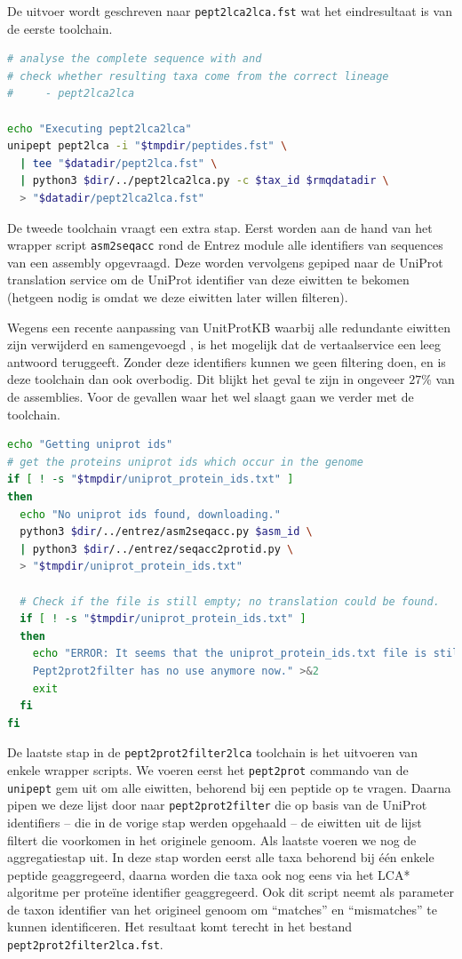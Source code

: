 De uitvoer wordt geschreven naar \texttt{pept2lca2lca.fst} wat het eindresultaat
is van de eerste toolchain.

\begin{lstlisting}[language=Bash,firstnumber=46]
# analyse the complete sequence with and
# check whether resulting taxa come from the correct lineage
#     - pept2lca2lca

echo "Executing pept2lca2lca"
unipept pept2lca -i "$tmpdir/peptides.fst" \
  | tee "$datadir/pept2lca.fst" \
  | python3 $dir/../pept2lca2lca.py -c $tax_id $rmqdatadir \
  > "$datadir/pept2lca2lca.fst"
\end{lstlisting}

De tweede toolchain vraagt een extra stap. Eerst worden aan de hand van het
wrapper script \texttt{asm2seqacc} rond de Entrez module alle identifiers van
sequences van een assembly opgevraagd. Deze worden vervolgens gepiped naar de
UniProt translation service om de UniProt identifier van deze eiwitten te
bekomen (hetgeen nodig is omdat we deze eiwitten later willen filteren).

Wegens een recente aanpassing van UnitProtKB waarbij alle redundante eiwitten
zijn verwijderd en samengevoegd \cite{Uniprotredun:online}, is het mogelijk
dat de vertaalservice een leeg antwoord teruggeeft. Zonder deze identifiers
kunnen we geen filtering doen, en is deze toolchain dan ook overbodig. Dit
blijkt het geval te zijn in ongeveer $27$\% van de assemblies. Voor de gevallen
waar het wel slaagt gaan we verder met de toolchain.

\begin{lstlisting}[language=Bash,firstnumber=55]
echo "Getting uniprot ids"
# get the proteins uniprot ids which occur in the genome
if [ ! -s "$tmpdir/uniprot_protein_ids.txt" ]
then
  echo "No uniprot ids found, downloading."
  python3 $dir/../entrez/asm2seqacc.py $asm_id \
  | python3 $dir/../entrez/seqacc2protid.py \
  > "$tmpdir/uniprot_protein_ids.txt"

  # Check if the file is still empty; no translation could be found.
  if [ ! -s "$tmpdir/uniprot_protein_ids.txt" ]
  then
    echo "ERROR: It seems that the uniprot_protein_ids.txt file is still empty. 
    Pept2prot2filter has no use anymore now." >&2
    exit
  fi
fi
\end{lstlisting}

De laatste stap in de \texttt{pept2prot2filter2lca} toolchain is het uitvoeren
van enkele wrapper scripts. We voeren eerst het \texttt{pept2prot} commando van
de \texttt{unipept} gem uit om alle eiwitten, behorend bij een peptide op te
vragen. Daarna pipen we deze lijst door naar \texttt{pept2prot2filter} die op
basis van de UniProt identifiers -- die in de vorige stap werden opgehaald -- de
eiwitten uit de lijst filtert die voorkomen in het originele genoom. Als laatste
voeren we nog de aggregatiestap uit. In deze stap worden eerst alle taxa
behorend bij één enkele peptide geaggregeerd, daarna worden die taxa ook nog
eens via het LCA* algoritme per proteïne identifier geaggregeerd. Ook
dit script neemt als parameter de taxon identifier van het origineel genoom om
``matches'' en ``mismatches'' te kunnen identificeren. Het resultaat komt
terecht in het bestand \texttt{pept2prot2filter2lca.fst}.

